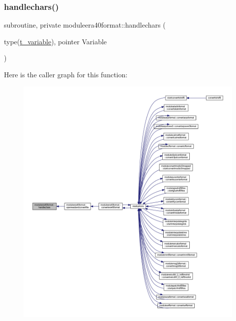 \subsubsection{\texorpdfstring{handlechars()}{handlechars()}}
{\footnotesize\ttfamily subroutine, private moduleera40format\+::handlechars (\begin{DoxyParamCaption}\item[{type(\mbox{\hyperlink{structmoduleera40format_1_1t__variable}{t\+\_\+variable}}), pointer}]{Variable }\end{DoxyParamCaption})\hspace{0.3cm}{\ttfamily [private]}}

Here is the caller graph for this function\+:\nopagebreak
\begin{figure}[H]
\begin{center}
\leavevmode
\includegraphics[width=350pt]{namespacemoduleera40format_a496e3a66acda20102bdeaa457f8faf96_icgraph}
\end{center}
\end{figure}
\mbox{\label{namespacemoduleera40format_a2dffd2c3e28995426ed11ff1f4ca7ad9}} 
